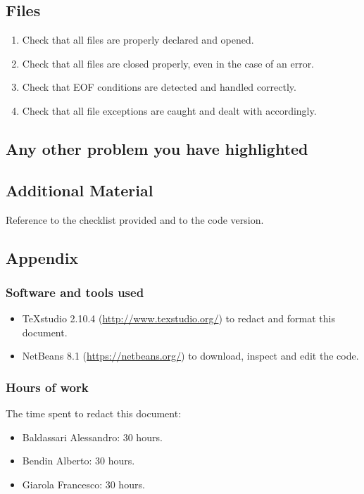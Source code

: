 \documentclass[a4paper,11pt]{report} %
\begin{document}
		\subsection*{Files}\begin{enumerate}[resume]
			\item Check that all files are properly declared and opened.
			\item Check that all files are closed properly, even in the case of an error.
			\item Check that EOF conditions are detected and handled correctly.
			\item Check that all file exceptions are caught and dealt with accordingly.
		\end{enumerate}
		
	
	\subsection{Any other problem you have highlighted}
	
	\subsection{Additional Material}
	Reference to the checklist provided and to the code version.
	
	\subsection{Appendix}
	
	\subsubsection{Software and tools used}
		\begin{itemize}
			\item TeXstudio 2.10.4 (\href{http://www.texstudio.org/}{http://www.texstudio.org/}) to redact and format this document.
			\item NetBeans 8.1 (\href{https://netbeans.org/}{https://netbeans.org/}) to download, inspect and edit the code.
		\end{itemize}
		
	\subsubsection{Hours of work} The time spent to redact this document:
		\begin{itemize}
			\item Baldassari Alessandro: 30 hours.
			\item Bendin Alberto: 30 hours.
			\item Giarola Francesco: 30 hours.
		\end{itemize}
\end{document}
